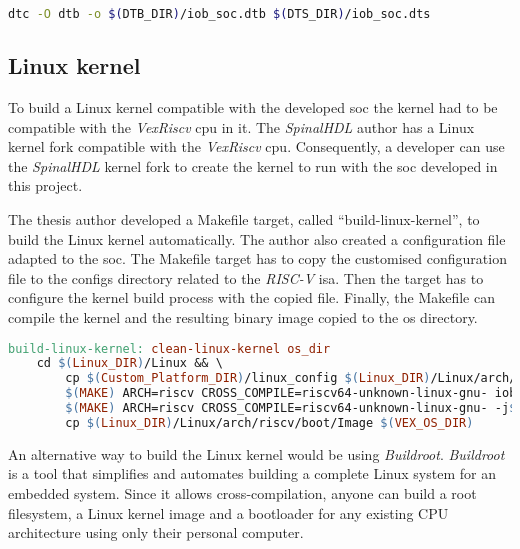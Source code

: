\begin{lstlisting}[language=bash, caption={Makefile target to build the device tree blob.}, label=lst:build_dtb]
dtc -O dtb -o $(DTB_DIR)/iob_soc.dtb $(DTS_DIR)/iob_soc.dts
\end{lstlisting}

\subsection{Linux kernel}
To build a Linux kernel compatible with the developed \acrshort{soc} the kernel had to be compatible with the \textit{VexRiscv} \acrshort{cpu} in it. The \textit{SpinalHDL} author has a Linux kernel fork compatible with the \textit{VexRiscv} \acrshort{cpu}. Consequently, a developer can use the \textit{SpinalHDL} kernel fork to create the kernel to run with the \acrshort{soc} developed in this project.

The thesis author developed a Makefile target, called \enquote{build-linux-kernel}, to build the Linux kernel automatically. The author also created a configuration file adapted to the \acrshort{soc}. The Makefile target has to copy the customised configuration file to the configs directory related to the \textit{RISC-V} \acrshort{isa}. Then the target has to configure the kernel build process with the copied file. Finally, the Makefile can compile the kernel and the resulting binary image copied to the \acrshort{os} directory.

\begin{lstlisting}[language=make, caption={Root file system Makefile target.}, label=lst:rootfs_makefile]
build-linux-kernel: clean-linux-kernel os_dir
    cd $(Linux_DIR)/Linux && \
        cp $(Custom_Platform_DIR)/linux_config $(Linux_DIR)/Linux/arch/riscv/configs/iob_soc_defconfig && \
        $(MAKE) ARCH=riscv CROSS_COMPILE=riscv64-unknown-linux-gnu- iob_soc_defconfig && \
        $(MAKE) ARCH=riscv CROSS_COMPILE=riscv64-unknown-linux-gnu- -j$(nproc) && \
        cp $(Linux_DIR)/Linux/arch/riscv/boot/Image $(VEX_OS_DIR)
\end{lstlisting}

An alternative way to build the Linux kernel would be using \textit{Buildroot}. \textit{Buildroot}~\cite{buildroot} is a tool that simplifies and automates building a complete Linux system for an embedded system. Since it allows cross-compilation, anyone can build a root filesystem, a Linux kernel image and a bootloader for any existing CPU architecture using only their personal computer.

